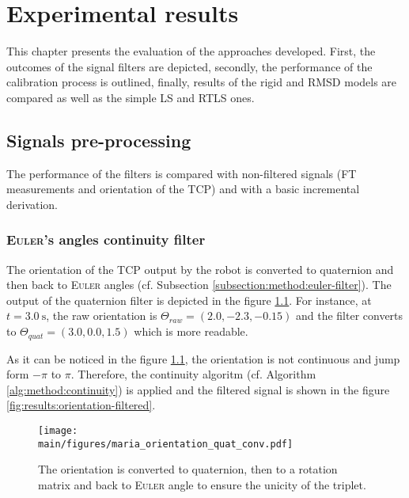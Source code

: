 \documentclass[/home/francois/latex/report/main.tex]{subfiles}
\begin{document}
\chapter{Experimental results}
\label{chapter:results}

This chapter presents the evaluation of the approaches developed. First, the outcomes of the signal filters are depicted, secondly, the performance of the calibration process is outlined, finally, results of the rigid and \ac{RMSD} models are compared as well as the simple \ac{LS} and \ac{RTLS} ones.

\section{Signals pre-processing}
\label{section:results:pre-processing}

The performance of the filters is compared with non-filtered signals (\ac{FT} measurements and orientation of the \ac{TCP}) and with a basic incremental derivation.

\subsection{\textsc{Euler}'s angles continuity filter}

The orientation of the \ac{TCP} output by the robot is converted to quaternion and then back to \textsc{Euler} angles (cf. Subsection \ref{subsection:method:euler-filter}). The output of the quaternion filter is depicted in the figure \ref{fig:results:quat-conv}. For instance, at $t = 3.0 \ \si{\second}$, the raw orientation is $\Theta_{raw} = (2.0, -2.3, -0.15)$ and the filter converts to  $\Theta_{quat} = (3.0, 0.0, 1.5)$ which is more readable.

As it can be noticed in the figure \ref{fig:results:quat-conv}, the orientation is not continuous and jump form $-\pi$ to $\pi$. Therefore, the continuity algoritm (cf. Algorithm \ref{alg:method:continuity}) is applied and the filtered signal is shown in the figure \ref{fig:results:orientation-filtered}.

\begin{figure}[h]
  \centering
  \texttt{[image: \\main/figures/maria\_orientation\_quat\_conv.pdf]}
  \caption{The orientation is converted to quaternion, then to a rotation matrix and back to \textsc{Euler} angle to ensure the unicity of the triplet.}
  \label{fig:results:quat-conv}
\end{figure}
\end{document}
